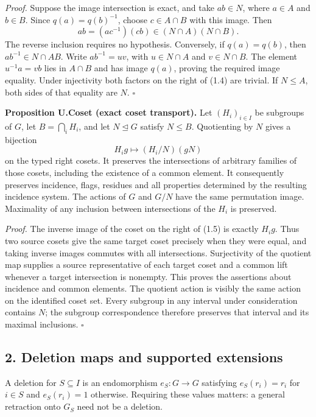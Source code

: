 \documentclass[
  11pt,
  a4paper,
]{article}
\newcounter{none} %
\begin{document}
\emph{Proof.} Suppose the image intersection is exact, and take
\(ab\in N\), where \(a\in A\) and \(b\in B\). Since \(q(a)=q(b)^{-1}\),
choose \(c\in A\cap B\) with this image. Then \[
ab=(ac^{-1})(cb)\in(N\cap A)(N\cap B).
\] The reverse inclusion requires no hypothesis. Conversely, if
\(q(a)=q(b)\), then \(ab^{-1}\in N\cap AB\). Write \(ab^{-1}=uv\), with
\(u\in N\cap A\) and \(v\in N\cap B\). The element \(u^{-1}a=vb\) lies
in \(A\cap B\) and has image \(q(a)\), proving the required image
equality. Under injectivity both factors on the right of (1.4) are
trivial. If \(N\leq A\), both sides of that equality are \(N\).
\(\square\)

\textbf{Proposition U.Coset (exact coset transport).} Let
\((H_i)_{i\in I}\) be subgroups of \(G\), let \(B=\bigcap_i H_i\), and
let \(N\unlhd G\) satisfy \(N\leq B\). Quotienting by \(N\) gives a
bijection \[
H_i g\longmapsto (H_i/N)(gN)
\tag{1.5}
\] on the typed right cosets. It preserves the intersections of
arbitrary families of those cosets, including the existence of a common
element. It consequently preserves incidence, flags, residues and all
properties determined by the resulting incidence system. The actions of
\(G\) and \(G/N\) have the same permutation image. Maximality of any
inclusion between intersections of the \(H_i\) is preserved.

\emph{Proof.} The inverse image of the coset on the right of (1.5) is
exactly \(H_i g\). Thus two source cosets give the same target coset
precisely when they were equal, and taking inverse images commutes with
all intersections. Surjectivity of the quotient map supplies a source
representative of each target coset and a common lift whenever a target
intersection is nonempty. This proves the assertions about incidence and
common elements. The quotient action is visibly the same action on the
identified coset set. Every subgroup in any interval under consideration
contains \(N\); the subgroup correspondence therefore preserves that
interval and its maximal inclusions. \(\square\)

\subsection{2. Deletion maps and supported
extensions}\label{deletion-maps-and-supported-extensions}

A deletion for \(S\subseteq I\) is an endomorphism \(e_S:G\to G\)
satisfying \(e_S(r_i)=r_i\) for \(i\in S\) and \(e_S(r_i)=1\) otherwise.
Requiring these values matters: a general retraction onto \(G_S\) need
not be a deletion.
\end{document}
